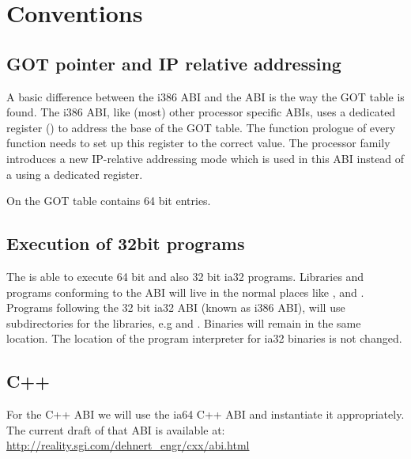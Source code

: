 
\chapter{Conventions}



\section{GOT pointer and IP relative addressing}

A basic difference between the i386 ABI and the \xARCH ABI is the
way the GOT table is found.  The i386 ABI, like (most) other processor
specific ABIs, uses a dedicated register () to address the
base of the GOT table.  The function prologue of every function needs
to set up this register to the correct value.  The \xARCH processor
family introduces a new IP-relative addressing mode which is used in
this ABI instead of a using a dedicated register.

On \xARCH the GOT table contains 64 bit entries.

\section{Execution of 32bit programs}


The \xARCH is able to execute 64 bit \xARCH and also 32 bit ia32
programs.  Libraries and programs conforming to the \xARCH ABI will
live in the normal places like ,  and
.  Programs following the 32 bit ia32 ABI (known as
i386 ABI), will use  subdirectories for the libraries, e.g
 and .  Binaries will remain in
the same location.  The location of the program interpreter for ia32
binaries is not changed.


\section{C++\label{section-cpp}}

For the C++ ABI we will use the ia64 C++ ABI and instantiate it
appropriately.  The current draft of that ABI is available at:\\
\url{http://reality.sgi.com/dehnert_engr/cxx/abi.html}


